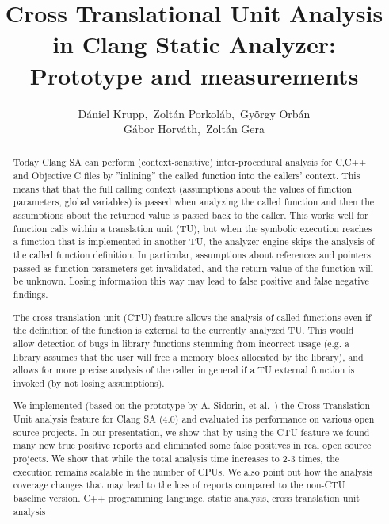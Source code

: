 \documentclass{article}
\title{Cross Translational Unit Analysis in Clang Static Analyzer: Prototype and measurements}
\author{D\'aniel Krupp\inst1,\ Zolt\'an Porkol\'ab\inst1,\ Gy\"orgy Orb\'an\inst1\\
        G\'abor Horv\'ath\inst2,\ Zolt\'an Gera\inst2}
\institute{\inst1Ericsson Ltd., \inst2E\"{o}tv\"{o}s Lor\'{a}nd University, Faculty of Informatics\\
             \inst1\url{daniel.krupp@ericsson.com}, 
             \inst1\url{zoltan.porkolab@ericsson.com},
             \inst1\url{gyorgy.orban@ericsson.com},
             \inst2\url{xazax@caesar.elte.hu}, 
             \inst2\url{gerazo@caesar.elte.hu}}
\begin{document}
\maketitle


\begin{abstract}
Today Clang SA can perform (context-sensitive) inter-procedural analysis for 
C,C++ and Objective C files by ''inlining'' 
the called function into the callers' context. This means that that the full 
calling context
(assumptions about the values of function parameters, global variables) is passed when 
analyzing the called function and
then the assumptions about the returned value is passed back to the caller. 
This works well for function calls within a
translation unit (TU), but when the symbolic execution reaches a function that 
is implemented in another TU, the analyzer engine 
skips the analysis of the called function definition. In particular,
assumptions about references and pointers passed as function 
parameters get invalidated, and the return value of the function will be unknown.
Losing information this way may lead to false positive
and false negative findings.

The cross translation unit (CTU) feature allows the analysis of called 
functions even if the definition of the function is external to the currently 
analyzed TU. This would allow detection of bugs in library functions stemming
from incorrect usage (e.g. a library assumes that the user will free a memory 
block allocated by the library), and allows for more precise analysis
of the caller in general if a TU external function is invoked
(by not losing assumptions).

We implemented (based on the prototype by A. Sidorin, et al.~\cite{artemctu})
the Cross Translation Unit analysis feature for Clang SA (4.0) and evaluated 
its performance on various open source projects. In our presentation, we show 
that by using the CTU feature we found many new true positive reports and 
eliminated some false positives in real open source projects. We show that 
while the total analysis time increases to 2-3 times, the execution remains
scalable in the number of CPUs. We also point out how the analysis
coverage changes that may lead to the loss of reports compared to the 
non-CTU baseline version.
\keywords C++ programming language, static analysis, cross translation unit analysis
\end{abstract}
\end{document}
